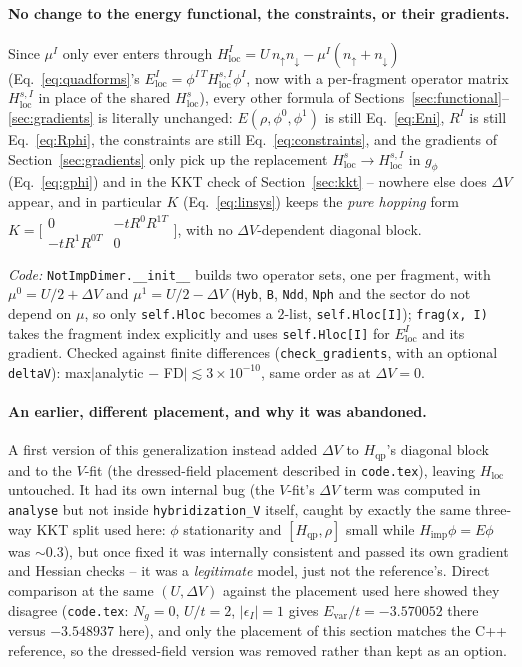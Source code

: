 \documentclass[11pt]{article}
\newcommand{\Ng}{N_{g}}
\newcommand{\Hqp}{H_{\mathrm{qp}}}
\newcommand{\Himp}{H_{\mathrm{imp}}}
\begin{document}
\paragraph{No change to the energy functional, the constraints, or their gradients.}
Since $\mu^I$ only ever enters through $H_{\mathrm{loc}}^I=U\,n_\uparrow n_\downarrow-\mu^I(n_\uparrow+n_\downarrow)$
(Eq.~\eqref{eq:quadforms}'s $E^I_{\mathrm{loc}}=\phi^{I\,T}H^{s,I}_{\mathrm{loc}}\phi^I$,
now with a per-fragment operator matrix $H^{s,I}_{\mathrm{loc}}$ in place of the shared
$H^s_{\mathrm{loc}}$), every other formula of Sections~\ref{sec:functional}--\ref{sec:gradients}
is literally unchanged: $E(\rho,\phi^0,\phi^1)$ is still Eq.~\eqref{eq:Eni}, $R^I$ is
still Eq.~\eqref{eq:Rphi}, the constraints are still Eq.~\eqref{eq:constraints}, and the
gradients of Section~\ref{sec:gradients} only pick up the replacement
$H^s_{\mathrm{loc}}\to H^{s,I}_{\mathrm{loc}}$ in $g_\phi$ (Eq.~\eqref{eq:gphi}) and in
the KKT check of Section~\ref{sec:kkt} -- nowhere else does $\Delta V$ appear, and in
particular $K$ (Eq.~\eqref{eq:linsys}) keeps the \emph{pure hopping} form
$K=\bigl[\begin{smallmatrix}0&-tR^0R^{1T}\\-tR^1R^{0T}&0\end{smallmatrix}\bigr]$, with no
$\Delta V$-dependent diagonal block.

\emph{Code:} \texttt{NotImpDimer.\_\_init\_\_} builds two operator sets, one per
fragment, with $\mu^0=U/2+\Delta V$ and $\mu^1=U/2-\Delta V$ (\texttt{Hyb}, \texttt{B},
\texttt{Ndd}, \texttt{Nph} and the sector do not depend on $\mu$, so only
\texttt{self.Hloc} becomes a $2$-list, \texttt{self.Hloc[I]}); \texttt{frag(x, I)} takes
the fragment index explicitly and uses \texttt{self.Hloc[I]} for $E^I_{\mathrm{loc}}$ and
its gradient. Checked against finite differences (\texttt{check\_gradients}, with an
optional \texttt{deltaV}): max$|$analytic $-$ FD$|\lesssim3\times10^{-10}$, same order as
at $\Delta V=0$.

\paragraph{An earlier, different placement, and why it was abandoned.} A first version
of this generalization instead added $\Delta V$ to $\Hqp$'s diagonal block and to the
$V$-fit (the dressed-field placement described in \texttt{code.tex}), leaving
$H_{\mathrm{loc}}$ untouched. It had its own internal bug (the $V$-fit's $\Delta V$ term
was computed in \texttt{analyse} but not inside \texttt{hybridization\_V} itself, caught
by exactly the same three-way KKT split used here: $\phi$ stationarity and
$[\Hqp,\rho]$ small while $\Himp\phi=E\phi$ was $\sim0.3$), but once fixed it was
internally consistent and passed its own gradient and Hessian checks -- it was a
\emph{legitimate} model, just not the reference's. Direct comparison at the same
$(U,\Delta V)$ against the placement used here showed they disagree (\texttt{code.tex}:
$\Ng=0$, $U/t=2$, $\lvert\epsilon_I\rvert=1$ gives $E_{\mathrm{var}}/t=-3.570052$ there
versus $-3.548937$ here), and only the placement of this section matches the C++
reference, so the dressed-field version was removed rather than kept as an option.
\end{document}
